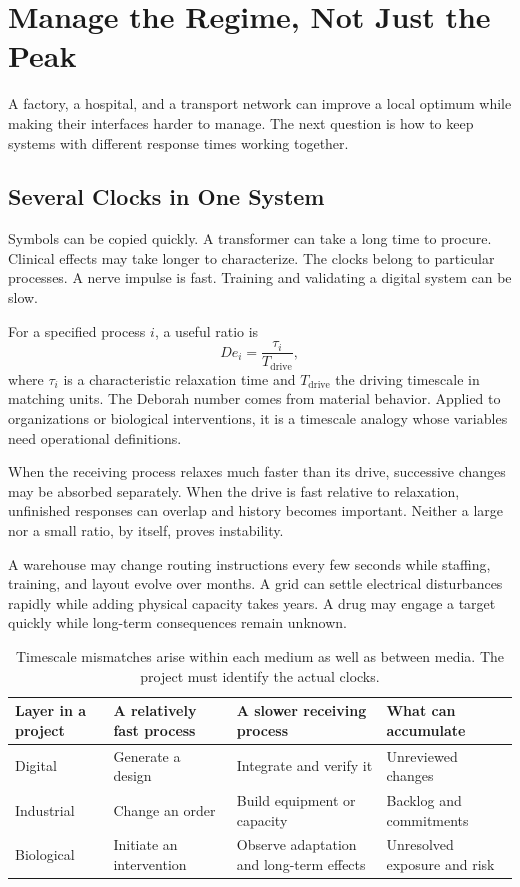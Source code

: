 \section{Manage the Regime, Not Just the Peak}

A factory, a hospital, and a transport network can improve a local optimum while making their interfaces harder to manage. The next question is how to keep systems with different response times working together.

\subsection{Several Clocks in One System}

Symbols can be copied quickly. A transformer can take a long time to procure. Clinical effects may take longer to characterize. The clocks belong to particular processes. A nerve impulse is fast. Training and validating a digital system can be slow.

For a specified process $i$, a useful ratio is
\begin{equation}
 De_i=\frac{\tau_i}{T_{\mathrm{drive}}},
\end{equation}
where $\tau_i$ is a characteristic relaxation time and $T_{\mathrm{drive}}$ the driving timescale in matching units. The Deborah number comes from material behavior. Applied to organizations or biological interventions, it is a timescale analogy whose variables need operational definitions.

When the receiving process relaxes much faster than its drive, successive changes may be absorbed separately. When the drive is fast relative to relaxation, unfinished responses can overlap and history becomes important. Neither a large nor a small ratio, by itself, proves instability.

A warehouse may change routing instructions every few seconds while staffing, training, and layout evolve over months. A grid can settle electrical disturbances rapidly while adding physical capacity takes years. A drug may engage a target quickly while long-term consequences remain unknown.

\begin{table}[ht]
\centering\small
\begin{tabularx}{\textwidth}{@{}lYYY@{}}
\toprule
Layer in a project & A relatively fast process & A slower receiving process & What can accumulate\\
\midrule
Digital & Generate a design & Integrate and verify it & Unreviewed changes\\
Industrial & Change an order & Build equipment or capacity & Backlog and commitments\\
Biological & Initiate an intervention & Observe adaptation and long-term effects & Unresolved exposure and risk\\
\bottomrule
\end{tabularx}
\caption{Timescale mismatches arise within each medium as well as between media. The project must identify the actual clocks.}
\end{table}

